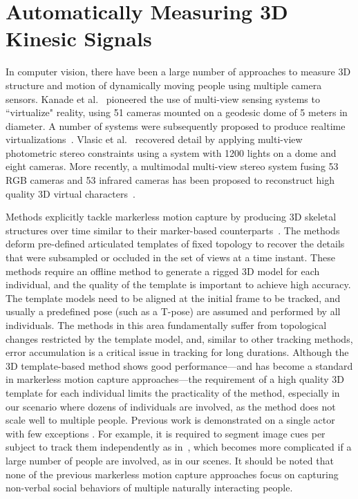 \section{Automatically Measuring 3D Kinesic Signals}

In computer vision, there have been a large number of approaches to measure 3D structure and motion of dynamically moving people using multiple camera sensors. Kanade et al.~\cite{Kanade-1997} pioneered the use of multi-view sensing systems to ``virtualize" reality, using 51 cameras mounted on a geodesic dome of 5 meters in diameter. A number of systems were subsequently proposed to produce realtime virtualizations~\cite{Matusik-2000,Matsuyama-2002,Gross-2003,Petit-2009}. Vlasic et al.~\cite{Vlasic-2009} recovered detail by applying multi-view photometric stereo constraints using a system with 1200 lights on a dome and eight cameras. More recently, a multimodal multi-view stereo system fusing 53 RGB cameras and 53 infrared cameras has been proposed to reconstruct high quality 3D virtual characters~\cite{Collet-15}. 

Methods explicitly tackle markerless motion capture by producing 3D skeletal structures over time similar to their marker-based counterparts~\cite{Gall-09, Gavrila-96, Cheung-05,Plankers-03, Bregler-04, Kehl-06, Corazza-10, Vlasic-08, Brox-10, Stoll-11, deAguiar-2008, Vlasic-2008, Furukawa-2008}. The methods deform pre-defined articulated templates of fixed topology to recover the details that were subsampled or occluded in the set of views at a time instant. These methods require an offline method to generate a rigged 3D model for each individual, and the quality of the template is important to achieve high accuracy. The template models need to be aligned at the initial frame to be tracked, and usually a predefined pose (such as a T-pose) are assumed and performed by all individuals. The methods in this area fundamentally suffer from topological changes restricted by the template model, and, similar to other tracking methods, error accumulation is a critical issue in tracking for long durations. Although the 3D template-based method shows good performance---and has become a standard in markerless motion capture approaches---the requirement of a high quality 3D template for each individual limits the practicality of the method, especially in our scenario where dozens of individuals are involved, as the method does not scale well to multiple people. Previous work is demonstrated on a single actor with few exceptions \cite{Ye-2012, Liu-2013}. For example, it is required to segment image cues per subject to track them independently as in~\cite{Liu-2013}, which becomes more complicated if a large number of people are involved, as in our scenes. It should be noted that none of the previous markerless motion capture approaches focus on capturing non-verbal social behaviors of multiple naturally interacting people.


